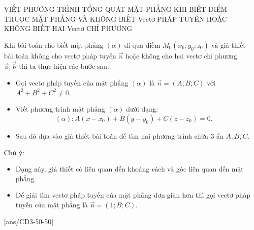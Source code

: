 \begin{dang}{VIẾT PHƯƠNG TRÌNH TỔNG QUÁT MẶT PHẲNG KHI BIẾT ĐIỂM THUỘC MẶT PHẲNG VÀ KHÔNG BIẾT Vectơ PHÁP TUYẾN HOẶC KHÔNG BIẾT HAI Vectơ CHỈ PHƯƠNG}
\end{dang}
\begin{tomtat}
	Khi bài toán cho biết mặt phẳng $(\alpha)$ đi qua điềm $M_0\left(x_0 ; y_0 ; z_0\right)$ và giả thiết bài toán không cho vectơ pháp tuyến $\overrightarrow{n}$ hoặc không cho hai vectơ chỉ phương $\overrightarrow{a}, \overrightarrow{b}$ thì ta thực hiện các bước sau:
	\begin{itemize}
		\item Gọi vectơ pháp tuyến của mặt phẳng $(\alpha)$ là $\overrightarrow{n}=(A ; B ; C)$ với $A^2+B^2+C^2 \neq 0$.
		\item Viết phương trình mặt phẳng $(\alpha)$ dưới dạng:
		$$
		(\alpha)\colon A\left(x-x_0\right)+B\left(y-y_0\right)+C\left(z-z_0\right)=0.
		$$
		\item Sau đó dựa vào giả thiết bài toán để tìm hai phương trình chứa 3 ẩn $A, B, C$.
	\end{itemize}
	Chú ý:
	\begin{itemize}
		\item Dạng này, giả thiết có liên quan đến khoảng cách và góc liên quan đến mặt phẳng.
		\item Để giải tìm vectơ pháp tuyến của mặt phẳng đơn giàn hơn thì gọi vectơ pháp tuyến của mặt phẳng là $\overrightarrow{n}=(1 ; B ; C)$.
	\end{itemize}
\end{tomtat}

[ans/CD3-50-50]
\TN

